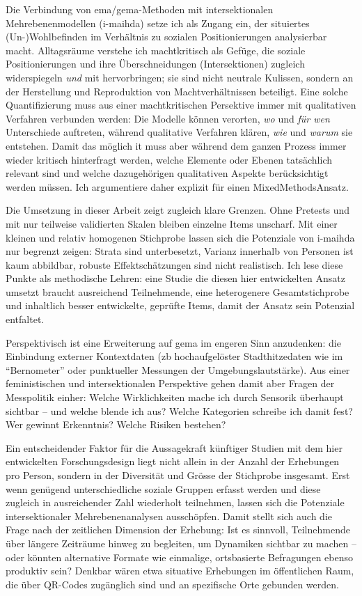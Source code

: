 Die Verbindung von \gls{ema}/\gls{gema}-Methoden mit intersektionalen Mehrebenenmodellen (\gls{i-maihda}) setze ich als Zugang ein, der situiertes (Un\nobreakdash-)Wohlbefinden im Verhältnis zu sozialen Positionierungen analysierbar macht. Alltagsräume verstehe ich machtkritisch als Gefüge, die soziale Positionierungen und ihre Überschneidungen (Intersektionen) zugleich widerspiegeln \emph{und} mit hervorbringen; sie sind nicht neutrale Kulissen, sondern an der Herstellung und Reproduktion von Machtverhältnissen beteiligt. 
Eine solche Quantifizierung muss aus einer machtkritischen Persektive immer mit qualitativen Verfahren verbunden werden: Die Modelle können verorten, \emph{wo} und \emph{für wen} Unterschiede auftreten, während qualitative Verfahren klären, \emph{wie} und \emph{warum} sie entstehen. Damit das möglich it muss aber während dem ganzen Prozess immer wieder kritisch hinterfragt werden, welche Elemente oder Ebenen tatsächlich relevant sind und welche dazugehörigen qualitativen Aspekte berücksichtigt werden müssen. Ich argumentiere daher explizit für einen Mixed\-Methods\-Ansatz.

Die Umsetzung in dieser Arbeit zeigt zugleich klare Grenzen. Ohne Pretests und mit nur teilweise validierten Skalen bleiben einzelne Items unscharf. Mit einer kleinen und relativ homogenen Stichprobe lassen sich die Potenziale von \gls{i-maihda} nur begrenzt zeigen: Strata sind unterbesetzt, Varianz innerhalb von Personen ist kaum abbildbar, robuste Effektschätzungen sind nicht realistisch. Ich lese diese Punkte als methodische Lehren: eine Studie die diesen hier entwickelten Ansatz umsetzt braucht ausreichend Teilnehmende, eine heterogenere Gesamtstichprobe und inhaltlich besser entwickelte, geprüfte Items, damit der Ansatz sein Potenzial entfaltet.

Perspektivisch ist eine Erweiterung auf \gls{gema} im engeren Sinn anzudenken: die Einbindung externer Kontextdaten (\gls{zb} hochaufgelöster Stadthitzedaten wie im \enquote{Bernometer} \parencite[siehe][]{burgerModellingSpatialPattern2021} oder punktueller Messungen der Umgebungslautstärke). Aus einer feministischen und intersektionalen Perspektive gehen damit aber Fragen der Messpolitik einher: Welche Wirklichkeiten mache ich durch Sensorik überhaupt sichtbar -- und welche blende ich aus? Welche Kategorien schreibe ich damit fest? Wer gewinnt Erkenntnis? Welche Risiken bestehen?

Ein entscheidender Faktor für die Aussagekraft künftiger Studien mit dem hier entwickelten Forschungsdesign liegt nicht allein in der Anzahl der Erhebungen pro Person, sondern in der Diversität und Grösse der Stichprobe insgesamt. Erst wenn genügend unterschiedliche soziale Gruppen erfasst werden und diese zugleich in ausreichender Zahl wiederholt teilnehmen, lassen sich die Potenziale intersektionaler Mehrebenenanalysen ausschöpfen. Damit stellt sich auch die Frage nach der zeitlichen Dimension der Erhebung: Ist es sinnvoll, Teilnehmende über längere Zeiträume hinweg zu begleiten, um Dynamiken sichtbar zu machen -- oder könnten alternative Formate wie einmalige, ortsbasierte Befragungen ebenso produktiv sein? Denkbar wären etwa situative Erhebungen im öffentlichen Raum, die über QR-Codes zugänglich sind und an spezifische Orte gebunden werden.

